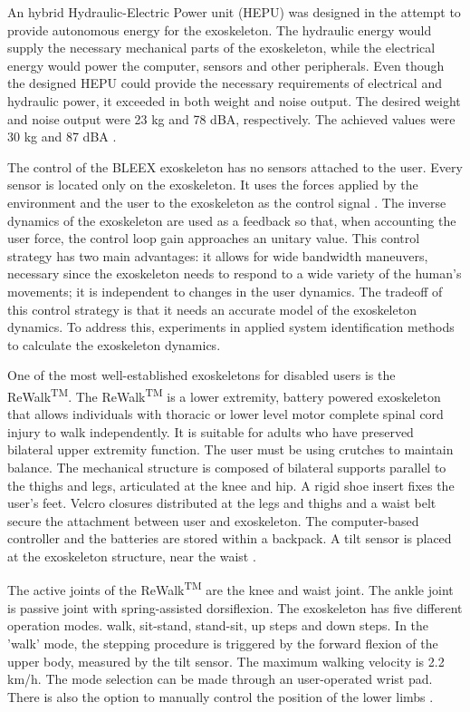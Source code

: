    An hybrid Hydraulic-Electric Power unit (HEPU) was designed in the attempt to provide autonomous energy for the exoskeleton. The hydraulic energy would supply the necessary mechanical parts of the exoskeleton, while the electrical energy would power the computer, sensors and other peripherals. Even though the designed HEPU could provide the necessary requirements of electrical and hydraulic power, it exceeded in both weight and noise output. The desired weight and noise output were 23 kg and 78 dBA, respectively. The achieved values were 30 kg and 87 dBA \cite{Amundson2006DevelopmentOH}.
   
   The control of the BLEEX exoskeleton has no sensors attached to the user. Every sensor is located only on the exoskeleton. It uses the forces applied by the environment and the user to the exoskeleton as the control signal \cite{Steger1642232}. The inverse dynamics of the exoskeleton are used as a feedback so that, when accounting the user force, the control loop gain approaches an unitary value. This control strategy has two main advantages: it allows for wide bandwidth maneuvers, necessary since the exoskeleton needs to respond to a wide variety of the human's movements; it is independent to changes in the user dynamics. The tradeoff of this control strategy is that it needs an accurate model of the exoskeleton dynamics. To address this, experiments in \cite{Ghan1642233} applied system identification methods to calculate the exoskeleton dynamics.
   
   One of the most well-established exoskeletons for disabled users is the ReWalk\textsuperscript{TM}. The ReWalk\textsuperscript{TM} is a lower extremity, battery powered exoskeleton that allows individuals with thoracic or lower level motor complete spinal cord injury to walk independently. It is suitable for adults who have preserved bilateral upper extremity function. The user must be using crutches to maintain balance. The mechanical structure is composed of bilateral supports parallel to the thighs and legs, articulated at the knee and hip. A rigid shoe insert fixes the user's feet. Velcro closures distributed at the legs and thighs and a waist belt secure the attachment between user and exoskeleton. The computer-based controller and the batteries are stored within a backpack. A tilt sensor is placed at the exoskeleton structure, near the waist \cite{Esquenazi2013}.
   
   The active joints of the ReWalk\textsuperscript{TM} are the knee and waist joint. The ankle joint is passive joint with spring-assisted dorsiflexion. The exoskeleton has five different operation modes. walk, sit-stand, stand-sit, up steps and down steps. In the 'walk' mode, the stepping procedure is triggered by the forward flexion of the upper body, measured by the tilt sensor. The maximum walking velocity is 2.2 km/h. The mode selection can be made through an user-operated wrist pad. There is also the option to manually control the position of the lower limbs \cite{Zeilig2012}. 
   
